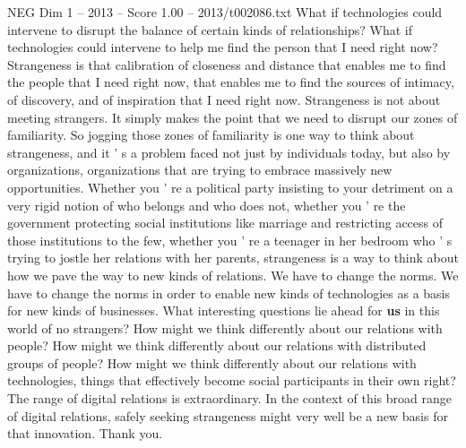 \begin{textsample}{NEG Dim 1 – 2013 – Score 1.00 – 2013/t002086.txt}
What if technologies could intervene to disrupt the balance of certain kinds of relationships?
What if technologies could intervene to help me find the person that I need right now?
Strangeness is that calibration of closeness and distance that enables me to find the people that I need right now, that enables me to find the sources of intimacy, of discovery, and of inspiration that I need right now.
Strangeness is not about meeting strangers.
It simply makes the point that we need to disrupt our zones of familiarity.
So jogging those zones of familiarity is one way to think about strangeness, and it ' s a problem faced not just by individuals today, but also by organizations, organizations that are trying to embrace massively new opportunities.
Whether you ' re a political party insisting to your detriment on a very rigid notion of who belongs and who does not, whether you ' re the government protecting social institutions like marriage and restricting access of those institutions to the few, whether you ' re a teenager in her bedroom who ' s trying to jostle her relations with her parents, strangeness is a way to think about how we pave the way to new kinds of relations.
We have to change the norms.
We have to change the norms in order to enable new kinds of technologies as a basis for new kinds of businesses.
What interesting questions lie ahead for \textbf{us} in this world of no strangers?
How might we think differently about our relations with people?
How might we think differently about our relations with distributed groups of people?
How might we think differently about our relations with technologies, things that effectively become social participants in their own right?
The range of digital relations is extraordinary.
In the context of this broad range of digital relations, safely seeking strangeness might very well be a new basis for that innovation.
Thank you.

\end{textsample}
